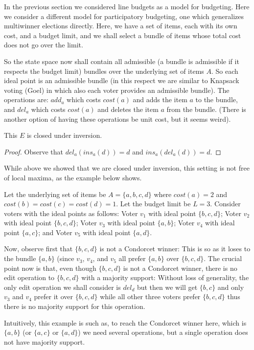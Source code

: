 \documentclass[sigconf]{aamas}  %
\begin{document}
In the previous section we considered line budgets as a model for budgeting.
Here we consider a different model for participatory budgeting, one which generalizes multiwinner elections directly. Here, we have a set of items, each with its own cost, and a budget limit, and we shall select a bundle of items whose total cost does not go over the limit.

So the state space now shall contain all admissible (a bundle is admissible if it respects the budget limit) bundles over the underlying set of items $A$. So each ideal point is an admissible bundle (in this respect we are similar to Knapsack voting (Goel) in which also each voter provides an admissible bundle).
The operations are: $add_a$ which costs $cost(a)$ and adds the item $a$ to the bundle, and $del_a$ which costs $cost(a)$ and deletes the item $a$ from the bundle. (There is another option of having these operations be unit cost, but it seems weird).

\begin{lemma}
  This $E$ is closed under inversion.
\end{lemma}

\begin{proof}
  Observe that $del_a(ins_a(d)) = d$ and $ins_a(del_a(d)) = d$.
\end{proof}

While above we showed that we are closed under inversion,
this setting is not free of local maxima, as the example below shows.

\begin{example}
%
Let the underlying set of items be $A = \{a, b, c, d\}$ where $cost(a) = 2$ and $cost(b) = cost(c) = cost(d) = 1$. Let the budget limit be $L = 3$.
Consider voters with the ideal points as follows:
  Voter $v_1$ with ideal point $\{b,c,d\}$;
  Voter $v_2$ with ideal point $\{b,c,d\}$;
  Voter $v_3$ with ideal point $\{a,b\}$;
  Voter $v_4$ with ideal point $\{a,c\}$;
  and Voter $v_5$ with ideal point $\{a,d\}$.

Now, observe first that $\{b,c,d\}$ is not a Condorcet winner:
  This is so as it loses to the bundle $\{a,b\}$ (since $v_3$, $v_4$, and $v_5$ all prefer $\{a,b\}$ over $\{b,c,d\}$.
The crucial point now is that, even though $\{b,c,d\}$ is not a Condorcet winner,
there is no edit operation to $\{b,c,d\}$ with a majority support:
  Without loss of generality, the only edit operation we shall consider is $del_d$ but then we will get $\{b,c\}$ and only $v_3$ and $v_4$ prefer it over $\{b,c,d\}$ while all other three voters prefer $\{b,c,d\}$ thus there is no majority support for this operation.

Intuitively, this example is such as, to reach the Condorcet winner here, which is $\{a,b\}$ (or $\{a,c\}$ or $\{a,d\}$) we need several operations, but a single operation does not have majority support.
%
\end{example}
\end{document}

